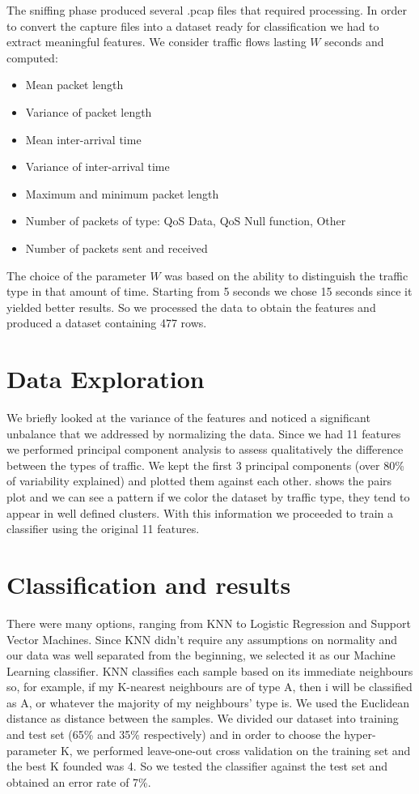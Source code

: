 \documentclass[11pt, USenglish]{article}
\begin{document}
The sniffing phase produced several .pcap files that required processing. In order to convert the capture files into a dataset ready for classification we had to extract meaningful features. We consider traffic flows lasting $W$ seconds and computed:

\begin{itemize}
    \item Mean packet length
    \item Variance of packet length
    \item Mean inter-arrival time
    \item Variance of inter-arrival time
    \item Maximum and minimum packet length
    \item Number of packets of type: QoS Data, QoS Null function, Other
    \item Number of packets sent and received
\end{itemize}

The choice of the parameter $W$ was based on the ability to distinguish the traffic type in that amount of time. Starting from 5 seconds we chose 15 seconds since it yielded better results. So we processed the data to obtain the features and produced a dataset containing 477 rows.


\section{Data Exploration}
We briefly looked at the variance of the features and noticed a significant unbalance %
that we addressed by normalizing the data. Since we had 11 features we performed principal component analysis to assess qualitatively the difference between the types of traffic. We kept the first 3 principal components (over 80\% of variability explained) and plotted them against each other. %
shows the pairs plot and we can see a pattern if we color the dataset by traffic type, they tend to appear in well defined clusters. With this information we proceeded to train a classifier using the original 11 features.


\section{Classification and results}
There were many options, ranging from KNN to Logistic Regression and Support Vector Machines. Since KNN didn't require any assumptions on normality and our data was well separated from the beginning, we selected it as our Machine Learning classifier. KNN classifies each sample based on its immediate neighbours so, for example, if my K-nearest neighbours are of type A, then i will be classified as A, or whatever the majority of my neighbours' type is. We used the Euclidean distance as distance between the samples. We divided our dataset into training and test set (65\% and 35\% respectively) and in order to choose the hyper-parameter K, we performed leave-one-out cross validation on the training set and the best K founded was 4. So we tested the classifier against the test set and obtained an error rate of 7\%.
\end{document}
